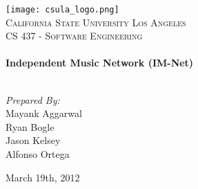 \begin{titlepage}
\begin{center}


\texttt{[image: csula\_logo.png]}\\[1cm]    

\textsc{\LARGE California State University Los Angeles}\\[1.5cm]

\textsc{\Large CS 437 - Software Engineering}\\[0.5cm]


\HRule \\[0.4cm]
{ \huge \bfseries \textcolor{title}{Independent Music Network (IM-Net)}}\\[0.4cm]

\HRule \\[1.5cm]

\begin{minipage}{0.4\textwidth}
\begin{center} \large
\emph{Prepared By:}\\
Mayank Aggarwal\\
Ryan Bogle\\
Jason Kelsey\\
Alfonso Ortega
\end{center}
\end{minipage}

\vfill

{\large March 19th, 2012}

\end{center}
\end{titlepage}